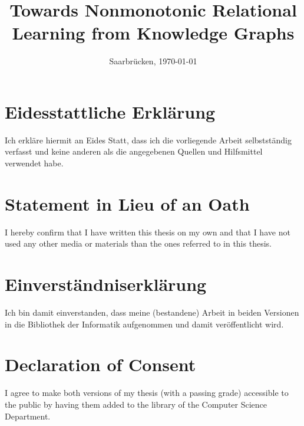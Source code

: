 \documentclass[11pt, a4paper, twoside]{Thesis}
\begin{document}


\frontmatter

\title  {Towards Nonmonotonic Relational Learning from Knowledge Graphs}

\addresses  {\groupname\\\deptname\\\univname}  %
\date       {Saarbr\"ucken, \today }
\subject    {}
\keywords   {}

\maketitle



\thispagestyle{empty}

\section*{Eidesstattliche Erkl\"{a}rung}
Ich erkl\"{a}re hiermit an Eides Statt, dass ich die vorliegende Arbeit selbstst\"{a}ndig verfasst und keine
anderen als die angegebenen Quellen und Hilfsmittel verwendet habe.

\vspace{0.60cm}
\section*{Statement in Lieu of an Oath}
I hereby confirm that I have written this thesis on my own and that I have not used any other media or
materials than the ones referred to in this thesis.
\vspace{1.5cm}

\section*{Einverst\"{a}ndniserkl\"{a}rung}
Ich bin damit einverstanden, dass meine (bestandene) Arbeit in beiden Versionen in die Bibliothek der
Informatik aufgenommen und damit ver\"{o}ffentlicht wird.

\vspace{0.60cm}
\section*{Declaration of Consent}
I agree to make both versions of my thesis (with a passing grade) accessible to the public by having
them added to the library of the Computer Science Department.
\vspace{3cm}
\end{document}

